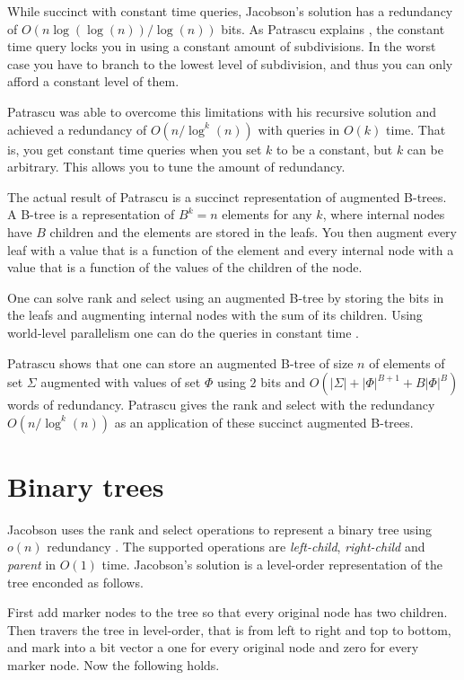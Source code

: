 \documentclass[11pt]{article}
\newcommand{\bigo}{O}
\newcommand{\smallo}{o}
\begin{document}
While succinct with constant time queries, Jacobson's solution has a
redundancy of $\bigo(n \log(\log(n)) / \log(n))$ bits. As Patrascu
explains \cite{patrascu08}, the constant time query locks you in using
a constant amount of subdivisions. In the worst case you have to
branch to the lowest level of subdivision, and thus you can only
afford a constant level of them.

Patrascu was able to overcome this limitations with his recursive
solution \cite{patrascu08} and achieved a redundancy of $\bigo(n /
\log^k(n))$ with queries in $\bigo(k)$ time. That is, you get constant
time queries when you set $k$ to be a constant, but $k$ can be
arbitrary. This allows you to tune the amount of redundancy.

The actual result of Patrascu is a succinct representation of
augmented B-trees. A B-tree is a representation of $B^k = n$ elements
for any $k$, where internal nodes have $B$ children and the elements
are stored in the leafs. You then augment every leaf with a value that
is a function of the element and every internal node with a value that
is a function of the values of the children of the node.

One can solve rank and select using an augmented B-tree
\cite{patrascu08} by storing the bits in the leafs and augmenting
internal nodes with the sum of its children. Using world-level
parallelism one can do the queries in constant time \cite{patrascu08}.

Patrascu shows \cite{patrascu08} that one can store an augmented
B-tree of size $n$ of elements of set $\Sigma$ augmented with values
of set $\Phi$ using $2$ bits and $\bigo(|\Sigma| + |\Phi|^{B+1} +
B|\Phi|^B)$ words of redundancy. Patrascu gives the rank and select
with the redundancy $\bigo(n / \log^k(n))$ as an application of these
succinct augmented B-trees.

\section{Binary trees}

Jacobson uses the rank and select operations to represent a binary
tree using $\smallo(n)$ redundancy \cite{jacobson89}. The supported
operations are \textit{left-child}, \textit{right-child} and
\textit{parent} in $\bigo(1)$ time. Jacobson's solution is a
level-order representation of the tree enconded as follows.

First add marker nodes to the tree so that every original node has two
children. Then travers the tree in level-order, that is from left to
right and top to bottom, and mark into a bit vector a one for every
original node and zero for every marker node. Now the following holds.
\end{document}
